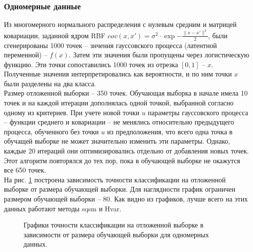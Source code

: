 \documentclass{llncs}
\begin{document}
\subsubsection{Одномерные данные}
Из многомерного нормального распределения с нулевым средним и матрицей ковариации, заданной ядром RBF $cov(x, x') = \sigma^2 \cdot \exp{-\frac{\|x-x'\|^2}{2}}$, были сгенерированы 1000 точек -- знчения гауссовского процесса (латентной переменной) -- $f(x)$. Затем эти значения были пропущены через логистическую функцию. Эти точки сопоставились 1000 точек из отрезка $\left[0, 1\right]$ -- $x$. Полученные значения интерпретировались как вероятности, и по ним точки $x$ были разделены на два класса. \\
Размер отложенной выборки -- 350 точек. Обучающая выборка в начале имела 10 точек и на каждой итерации дополнялась одной точкой, выбранной согласно одному из критериев. При учете новой точки $u$ параметры гауссовского процесса -- функции среднего и ковариации -- не менялись относительно предыдущего процесса, обученного без точки $u$ из предположения, что всего одна точка в обучащей выборке не может значительно изменить эти параметры. Однако, каждые 20 итераций они оптимизировались отдельно от добавления новых точек. Этот алгоритм повторялся до тех пор, пока в обучающей выборке не окажутся все 650 точек.\\
На рис. \ref{acc1dim} построена зависимость точности классификации на отложенной выборке от размера обучающей выборки. Для наглядности график ограничен размером обучающей выборки -- 80. Как видно из графиков, лучше всего на этих данных работают методы sqsm и Hvar.\\
\begin{figure}[h]
\vspace{0 cm}
\caption{Графики точности классификации на отложенной выборке в зависимости от размера обучающей выборки для одномерных данных.}
\label{acc1dim}
\end{figure}
\end{document}
